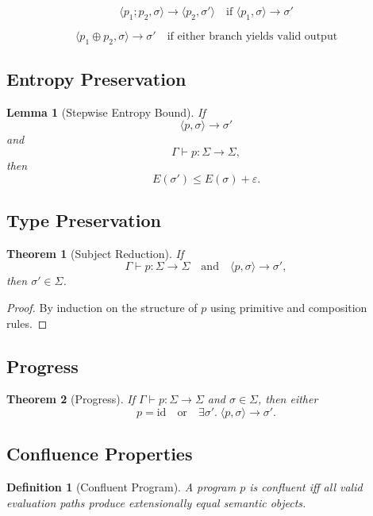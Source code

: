 \documentclass[11pt]{article}
\newtheorem{definition}{Definition}
\newtheorem{theorem}{Theorem}
\newtheorem{lemma}{Lemma}
\begin{document}
\[
\langle p_1 ; p_2, \sigma \rangle \to \langle p_2, \sigma' \rangle
\quad \text{if } \langle p_1, \sigma \rangle \to \sigma'
\]

\[
\langle p_1 \oplus p_2, \sigma \rangle \to \sigma'
\quad \text{if either branch yields valid output}
\]

\subsection{Entropy Preservation}

\begin{lemma}[Stepwise Entropy Bound]
If
\[
\langle p, \sigma \rangle \to \sigma'
\]
and
\[
\Gamma \vdash p : \Sigma \to \Sigma,
\]
then
\[
E(\sigma') \le E(\sigma) + \varepsilon.
\]
\end{lemma}

\subsection{Type Preservation}

\begin{theorem}[Subject Reduction]
If
\[
\Gamma \vdash p : \Sigma \to \Sigma
\quad \text{and} \quad
\langle p, \sigma \rangle \to \sigma',
\]
then $\sigma' \in \Sigma$.
\end{theorem}

\begin{proof}
By induction on the structure of $p$ using primitive and composition rules.
\end{proof}

\subsection{Progress}

\begin{theorem}[Progress]
If $\Gamma \vdash p : \Sigma \to \Sigma$ and $\sigma \in \Sigma$, then either
\[
p = \text{id}
\quad \text{or} \quad
\exists \sigma'.\; \langle p, \sigma \rangle \to \sigma'.
\]
\end{theorem}

\subsection{Confluence Properties}

\begin{definition}[Confluent Program]
A program $p$ is confluent iff all valid evaluation paths produce extensionally equal
semantic objects.
\end{definition}
\end{document}
